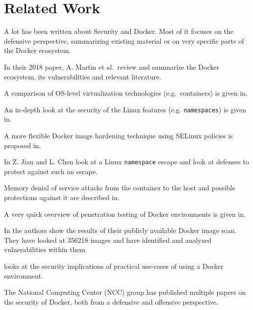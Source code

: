 \chapter{Related Work}\label{chapter:relatedwork}
A lot has been written about Security and Docker. Most of it focuses on the defensive perspective, summarizing existing material or on very specific parts of the Docker ecosystem.

\medskip

In their 2018 paper, A. Martin et al.\ review and summarize the Docker ecosystem, its vulnerabilities and relevant literature\cite{Docker-Ecosystem-Vulnerability-Analysis}. 

A comparison of OS-level virtualization technologies (e.g.\ containers) is given in\cite{Security-OS-level-Virtualization}. 

An in-depth look at the security of the Linux features (e.g. \lstinline{namespaces}) is given in\cite{Analysis-Docker-Security}. 

A more flexible Docker image hardening technique using SELinux policies is proposed in\cite{DockerPolicyModules}. 

In\cite{Defense-Docker-Escape} Z. Jian and L. Chen look at a Linux \lstinline{namespace} escape and look at defenses to protect against such an escape. 

Memory denial of service attacks from the container to the host and possible protections against it are described in\cite{Securing-Docker-Containers-from-DOS}. 

A very quick overview of penetration testing of Docker environments is given in\cite{Research-Pentesting-Docker-Environment}. 

In\cite{Study-Vulnerabilities-Docker-Hub} the authors show the results of their publicly available Docker image scan. They have looked at 356218 images and have identified and analyzed vulnerabilities within them.

\cite{To-Docker-Not-To-Docker} looks at the security implications of practical use-cases of using a Docker environment. 

The National Computing Center (NCC) group has published multiple papers on the security of Docker, both from a defensive\cite{Understanding-and-Hardening-Linux-Containers} and offensive\cite{Abusing-Containers} perspective.
